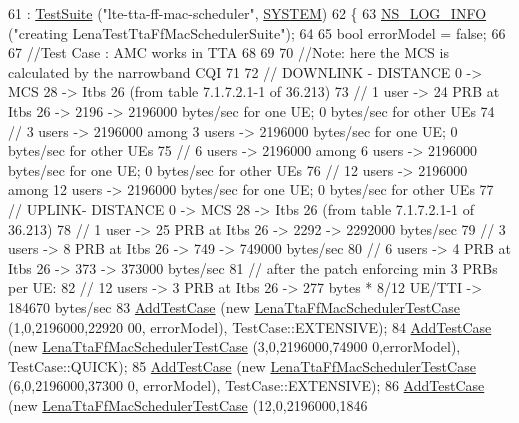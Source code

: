 \begin{DoxyCode}
61   : \hyperlink{classns3_1_1TestSuite_a904b0c40583b744d30908aeb94636d1a}{TestSuite} (\textcolor{stringliteral}{"lte-tta-ff-mac-scheduler"}, \hyperlink{classns3_1_1TestSuite_a1ebfcab34ec8161e085e8e3a1855eae0a90c5529a26ab3a5ffcc6e57040dbd82e}{SYSTEM})
62 \{
63   \hyperlink{group__logging_gafbd73ee2cf9f26b319f49086d8e860fb}{NS\_LOG\_INFO} (\textcolor{stringliteral}{"creating LenaTestTtaFfMacSchedulerSuite"});
64 
65   \textcolor{keywordtype}{bool} errorModel = \textcolor{keyword}{false};
66 
67   \textcolor{comment}{//Test Case : AMC works in TTA}
68 
69 
70   \textcolor{comment}{//Note: here the MCS is calculated by the narrowband CQI}
71 
72   \textcolor{comment}{// DOWNLINK - DISTANCE 0 -> MCS 28 -> Itbs 26 (from table 7.1.7.2.1-1 of 36.213)}
73   \textcolor{comment}{// 1 user -> 24 PRB at Itbs 26 -> 2196 -> 2196000 bytes/sec for one UE; 0 bytes/sec for other UEs}
74   \textcolor{comment}{// 3 users -> 2196000 among 3 users -> 2196000 bytes/sec for one UE; 0 bytes/sec for other UEs}
75   \textcolor{comment}{// 6 users -> 2196000 among 6 users -> 2196000 bytes/sec for one UE; 0 bytes/sec for other UEs}
76   \textcolor{comment}{// 12 users -> 2196000 among 12 users -> 2196000 bytes/sec for one UE; 0 bytes/sec for other UEs}
77   \textcolor{comment}{// UPLINK- DISTANCE 0 -> MCS 28 -> Itbs 26 (from table 7.1.7.2.1-1 of 36.213)}
78   \textcolor{comment}{// 1 user -> 25 PRB at Itbs 26 -> 2292 -> 2292000 bytes/sec}
79   \textcolor{comment}{// 3 users -> 8 PRB at Itbs 26 -> 749 -> 749000 bytes/sec}
80   \textcolor{comment}{// 6 users -> 4 PRB at Itbs 26 -> 373 -> 373000 bytes/sec}
81   \textcolor{comment}{// after the patch enforcing min 3 PRBs per UE:}
82   \textcolor{comment}{// 12 users -> 3 PRB at Itbs 26 -> 277 bytes * 8/12 UE/TTI -> 184670 bytes/sec}
83   \hyperlink{classns3_1_1TestCase_a3718088e3eefd5d6454569d2e0ddd835}{AddTestCase} (\textcolor{keyword}{new} \hyperlink{classLenaTtaFfMacSchedulerTestCase}{LenaTtaFfMacSchedulerTestCase} (1,0,2196000,22920
      00, errorModel), TestCase::EXTENSIVE);
84   \hyperlink{classns3_1_1TestCase_a3718088e3eefd5d6454569d2e0ddd835}{AddTestCase} (\textcolor{keyword}{new} \hyperlink{classLenaTtaFfMacSchedulerTestCase}{LenaTtaFfMacSchedulerTestCase} (3,0,2196000,74900
      0,errorModel), TestCase::QUICK);
85   \hyperlink{classns3_1_1TestCase_a3718088e3eefd5d6454569d2e0ddd835}{AddTestCase} (\textcolor{keyword}{new} \hyperlink{classLenaTtaFfMacSchedulerTestCase}{LenaTtaFfMacSchedulerTestCase} (6,0,2196000,37300
      0, errorModel), TestCase::EXTENSIVE);
86   \hyperlink{classns3_1_1TestCase_a3718088e3eefd5d6454569d2e0ddd835}{AddTestCase} (\textcolor{keyword}{new} \hyperlink{classLenaTtaFfMacSchedulerTestCase}{LenaTtaFfMacSchedulerTestCase} (12,0,2196000,1846

\end{DoxyCode}
